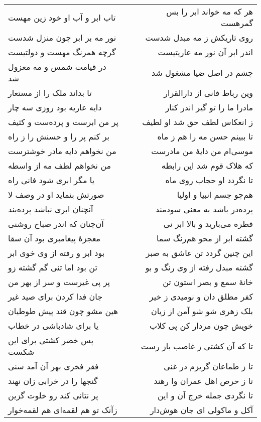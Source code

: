 \begin{center}
\begin{longtable}{l p{0.5cm} r}
تاب ابر و آب او خود زین مهست
&&
هر که مه خواند ابر را بس گمرهست
\\
نور مه بر ابر چون منزل شدست
&&
روی تاریکش ز مه مبدل شدست
\\
گرچه همرنگ مهست و دولتیست
&&
اندر ابر آن نور مه عاریتیست
\\
در قیامت شمس و مه معزول شد
&&
چشم در اصل ضیا مشغول شد
\\
تا بداند ملک را از مستعار
&&
وین رباط فانی از دارالقرار
\\
دایه عاریه بود روزی سه چار
&&
مادرا ما را تو گیر اندر کنار
\\
پر من ابرست و پرده‌ست و کثیف
&&
ز انعکاس لطف حق شد او لطیف
\\
بر کنم پر را و حسنش را ز راه
&&
تا ببینم حسن مه را هم ز ماه
\\
من نخواهم دایه مادر خوشترست
&&
موسی‌ام من دایهٔ من مادرست
\\
من نخواهم لطف مه از واسطه
&&
که هلاک قوم شد این رابطه
\\
یا مگر ابری شود فانی راه
&&
تا نگردد او حجاب روی ماه
\\
صورتش بنماید او در وصف لا
&&
هم‌چو جسم انبیا و اولیا
\\
آنچنان ابری نباشد پرده‌بند
&&
پرده‌در باشد به معنی سودمند
\\
آن‌چنان که اندر صباح روشنی
&&
قطره می‌بارید و بالا ابر نی
\\
معجزهٔ پیغامبری بود آن سقا
&&
گشته ابر از محو هم‌رنگ سما
\\
بود ابر و رفته از وی خوی ابر
&&
این چنین گردد تن عاشق به صبر
\\
تن بود اما تنی گم گشته زو
&&
گشته مبدل رفته از وی رنگ و بو
\\
پر پی غیرست و سر از بهر من
&&
خانهٔ سمع و بصر استون تن
\\
جان فدا کردن برای صید غیر
&&
کفر مطلق دان و نومیدی ز خیر
\\
هین مشو چون قند پیش طوطیان
&&
بلک زهری شو شو آمن از زیان
\\
یا برای شادباشی در خطاب
&&
خویش چون مردار کن پی کلاب
\\
پس خضر کشتی برای این شکست
&&
تا که آن کشتی ز غاصب باز رست
\\
فقر فخری بهر آن آمد سنی
&&
تا ز طماعان گریزم در غنی
\\
گنجها را در خرابی زان نهند
&&
تا ز حرص اهل عمران وا رهند
\\
پر نتانی کند رو خلوت گزین
&&
تا نگردی جمله خرج آن و این
\\
زآنک تو هم لقمه‌ای هم لقمه‌خوار
&&
آکل و ماکولی ای جان هوش‌دار
\\
\end{longtable}
\end{center}
